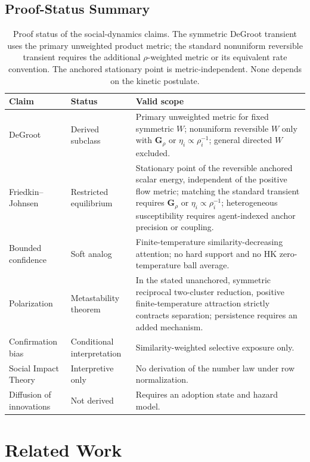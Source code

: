 \documentclass[12pt]{article}
\begin{document}
\subsection{Proof-Status Summary}

\begin{table}[ht]
\centering
\begin{tabular}{@{}p{3.1cm}p{3.2cm}p{6.1cm}@{}}
\toprule
\textbf{Claim} & \textbf{Status} & \textbf{Valid scope} \\
\midrule
DeGroot & Derived subclass & Primary unweighted metric for fixed symmetric $W$; nonuniform reversible $W$ only with $\mathbf G_\rho$ or $\eta_i\propto\rho_i^{-1}$; general directed $W$ excluded. \\
Friedkin--Johnsen & Restricted equilibrium & Stationary point of the reversible anchored scalar energy, independent of the positive flow metric; matching the standard transient requires $\mathbf G_\rho$ or $\eta_i\propto\rho_i^{-1}$; heterogeneous susceptibility requires agent-indexed anchor precision or coupling. \\
Bounded confidence & Soft analog & Finite-temperature similarity-decreasing attention; no hard support and no HK zero-temperature ball average. \\
Polarization & Metastability theorem & In the stated unanchored, symmetric reciprocal two-cluster reduction, positive finite-temperature attraction strictly contracts separation; persistence requires an added mechanism. \\
Confirmation bias & Conditional interpretation & Similarity-weighted selective exposure only. \\
Social Impact Theory & Interpretive only & No derivation of the number law under row normalization. \\
Diffusion of innovations & Not derived & Requires an adoption state and hazard model. \\
\bottomrule
\end{tabular}
\caption{Proof status of the social-dynamics claims.  The symmetric DeGroot transient uses the primary unweighted product metric; the standard nonuniform reversible transient requires the additional $\rho$-weighted metric or its equivalent rate convention.  The anchored stationary point is metric-independent.  None depends on the kinetic postulate.}
\label{tab:rigor}
\end{table}


\section{Related Work}
\end{document}
